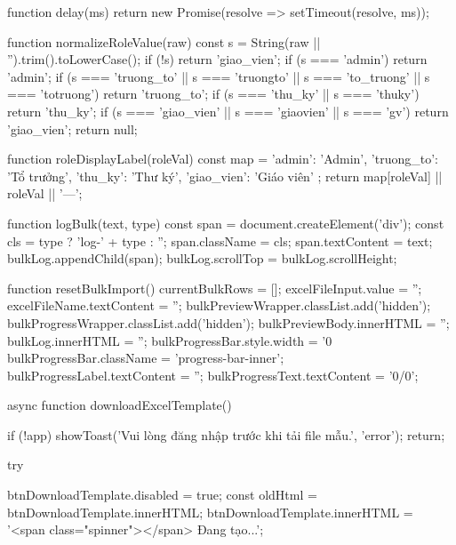 {            function delay(ms) {
                return new Promise(resolve => setTimeout(resolve, ms));
            }

            function normalizeRoleValue(raw) {
                const s = String(raw || '').trim().toLowerCase();
                if (!s) return 'giao_vien';
                if (s === 'admin') return 'admin';
                if (s === 'truong_to' || s === 'truongto' || s === 'to_truong' || s === 'totruong') return 'truong_to';
                if (s === 'thu_ky' || s === 'thuky') return 'thu_ky';
                if (s === 'giao_vien' || s === 'giaovien' || s === 'gv') return 'giao_vien';
                return null;
            }

            function roleDisplayLabel(roleVal) {
                const map = {
                    'admin': 'Admin',
                    'truong_to': 'Tổ trưởng',
                    'thu_ky': 'Thư ký',
                    'giao_vien': 'Giáo viên'
                };
                return map[roleVal] || roleVal || '—';
            }

            function logBulk(text, type) {
                const span = document.createElement('div');
                const cls = type ? 'log-' + type : '';
                span.className = cls;
                span.textContent = text;
                bulkLog.appendChild(span);
                bulkLog.scrollTop = bulkLog.scrollHeight;
            }

            function resetBulkImport() {
                currentBulkRows = [];
                excelFileInput.value = '';
                excelFileName.textContent = '';
                bulkPreviewWrapper.classList.add('hidden');
                bulkProgressWrapper.classList.add('hidden');
                bulkPreviewBody.innerHTML = '';
                bulkLog.innerHTML = '';
                bulkProgressBar.style.width = '0%
                bulkProgressBar.className = 'progress-bar-inner';
                bulkProgressLabel.textContent = '';
                bulkProgressText.textContent = '0/0';
            }

            async function downloadExcelTemplate() {
                if (!app) {
                    showToast('Vui lòng đăng nhập trước khi tải file mẫu.', 'error');
                    return;
                }

                try {
                    btnDownloadTemplate.disabled = true;
                    const oldHtml = btnDownloadTemplate.innerHTML;
                    btnDownloadTemplate.innerHTML = '<span class="spinner"></span> Đang tạo...';

}}}
